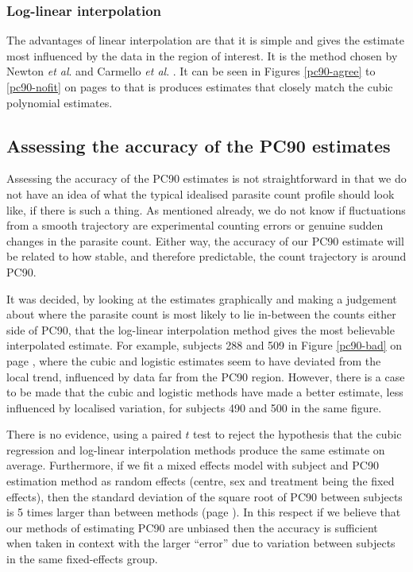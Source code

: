 \subsubsection*{Log-linear interpolation}
The advantages of linear interpolation are that it is simple and gives the estimate most influenced by the data in the region of interest. It is the method chosen by Newton {\it et al}. and Carmello {\it et al}. \cite{newton, carmello}. It can be seen in Figures \ref{pc90-agree} to \ref{pc90-nofit} on pages \pageref{pc90-agree} to \pageref{pc90-nofit} that is produces estimates that closely match the cubic polynomial estimates.

\subsection{Assessing the accuracy of the PC90 estimates}
Assessing the accuracy of the PC90 estimates is not straightforward in that we do not have an idea of what the typical idealised parasite count profile should look like, if there is such a thing. As mentioned already, we do not know if fluctuations from a smooth trajectory are experimental counting errors or genuine sudden changes in the parasite count. Either way, the accuracy of our PC90 estimate will be related to how stable, and therefore predictable, the count trajectory is around PC90.

It was decided, by looking at the estimates graphically and making a judgement about where the parasite count is most likely to lie in-between the counts either side of PC90, that the log-linear interpolation method gives the most believable interpolated estimate. For example, subjects 288 and 509 in Figure \ref{pc90-bad} on page \pageref{pc90-bad}, where the cubic and logistic estimates seem to have deviated from the local trend, influenced by data far from the PC90 region. However, there is a case to be made that the cubic and logistic methods have made a better estimate, less influenced by localised variation, for subjects 490 and 500 in the same figure.

There is no evidence, using a paired $t$ test to reject the hypothesis that the cubic regression and log-linear interpolation methods produce the same estimate on average. Furthermore, if we fit a mixed effects model with subject and PC90 estimation method as random effects (centre, sex and treatment being the fixed effects), then the standard deviation of the square root of PC90 between subjects is 5 times larger than between methods (page \pageref{methods.lme}). In this respect if we believe that our methods of estimating PC90 are unbiased then the accuracy is sufficient when taken in context with the larger ``error'' due to variation between subjects in the same fixed-effects group.

